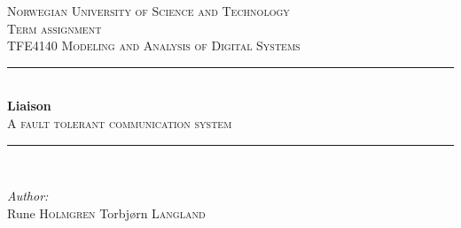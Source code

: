 \documentclass[a4paper]{IEEEtran}
\begin{document}
\begin{titlepage}

    \newcommand{\HRule}{\rule{\linewidth}{0.5mm}} %

    \center %

    \vspace*{2cm}


    \textsc{\LARGE Norwegian University of Science and Technology}\\[1.5cm] %
    \vspace*{1cm}
    \textsc{\Large Term assignment}\\[0.5cm] %
    \textsc{\large TFE4140 Modeling and Analysis of Digital Systems}\\[0.5cm] %
    \vspace*{1.4cm}


    \HRule \\[0.4cm]
    { \huge \bfseries Liaison}\\[0.4cm] %
    \textsc{\large A fault tolerant communication system}\\[0.5cm] %
    \HRule \\[1.5cm]

    \vspace*{1cm}

    \begin{minipage}{0.4\textwidth}
        \begin{flushleft} \large
            \emph{Author:}\\
            Rune \textsc{Holmgren} \newline%
            Torbjørn \textsc{Langland} %
        \end{flushleft}
    \end{minipage}
    ~
    \begin{minipage}{0.4\textwidth}
        \begin{flushright} \large
            \emph{} \\
            \textsc{} %
        \end{flushright}
    \end{minipage}\\[4cm]


\end{titlepage}
\end{document}
